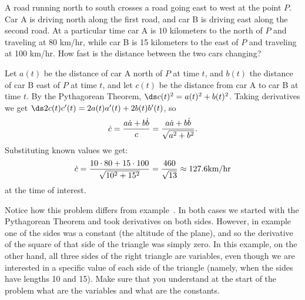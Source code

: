 \begin{example}
A road running north to south crosses a road going east to west at the
point $P$.  Car A is driving north along the first road, and car B is
driving east along the second road.  At a particular time car A is $10$
kilometers to the north of $P$ and traveling at 80 km/hr, while car B
is 15 kilometers to the east of $P$ and traveling at 100 km/hr.
How fast is the distance between the two cars
changing?

Let $a(t)$ be the distance of car A north of $P$ at time $t$, and
$b(t)$ the distance of car B east of $P$ at time $t$, and let $c(t)$
be the distance from car A to car B at time $t$.  By the Pythagorean
Theorem, $\ds c(t)^2=a(t)^2+b(t)^2$. Taking derivatives
we get $\ds 2c(t)c'(t)=2a(t)a'(t)+2b(t)b'(t)$, so
$$
  \dot{c}={a\dot{a}+b\dot{b}\over c}={a\dot{a}+b\dot{b}\over \sqrt{a^2+b^2}}.
$$
Substituting known values we get:
$$
\dot{c}={10\cdot 80+15\cdot100\over
  \sqrt{10^2+15^2}}={460\over\sqrt{13}} \approx 127.6 \hbox{km/hr}
$$
at the time of interest.
\end{example}
\label{exam:departing cars}


Notice how this problem differs from example~.  In both cases we started with the Pythagorean Theorem and
took derivatives on both sides.  However, in
example~ one of the sides was a constant
(the altitude of the plane), and so the derivative of the square of
that side of the triangle was simply zero.  In this example, on the
other hand, all three sides of the right triangle are variables, even
though we are interested in a specific value of each side of the
triangle (namely, when the sides have lengths 10 and 15). Make sure that
you understand at the start of the problem what are the variables and
what are the constants.

